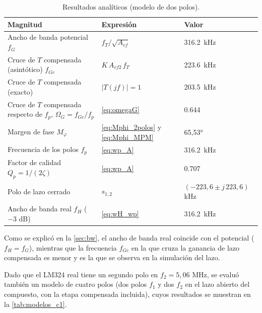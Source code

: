 \begin{table}[H]
\centering
\caption{Resultados analíticos (modelo de dos polos).}
\label{tab:analitica_c1}
\small
\setlength{\tabcolsep}{4pt}
\begin{tabular}{>{\raggedright\arraybackslash}p{} >{\centering\arraybackslash}p{} >{\centering\arraybackslash}p{}}
\toprule
\textbf{Magnitud} & \textbf{Expresión} & \textbf{Valor} \\
\midrule
Ancho de banda potencial $f_G$ & $f_T/\sqrt{A_{vf}}$ & \SI{316,2}{kHz} \\
Cruce de $T$ compensada (asintótico) $f_{Gc}$ & $K\,A_{vf2}\,f_T$ & \SI{223,6}{kHz} \\
Cruce de $T$ compensada (exacto) & $|T(jf)|=1$ & \SI{203,5}{kHz} \\
Cruce de $T$ compensada respecto de $f_p$, $\Omega_G = f_{Gc}/f_p$ & \autoref{eq:omegaG} & \num{0,644} \\
Margen de fase $M_\varphi$ & \autoref{eq:Mphi_2polos} y \autoref{eq:Mphi_MPM} & \ang{65,53} \\
Frecuencia de los polos $f_p$ & \autoref{eq:wp_A} & \SI{316,2}{kHz} \\
Factor de calidad $Q_p = 1/(2\zeta)$ & \autoref{eq:wp_A} & \num{0,707} \\
Polo de lazo cerrado & $s_{1,2}$ & $(-223{,}6 \pm j\,223{,}6)$ kHz \\
Ancho de banda real $f_H$ ($-3$ dB) & \autoref{eq:wH_wp} & \SI{316,2}{kHz} \\
\bottomrule
\end{tabular}
\end{table}

Como se explicó en la \autoref{sec:bw}, el ancho de banda real coincide con el potencial ($f_H = f_G$), mientras que la frecuencia $f_{Gc}$ en la que cruza la ganancia de lazo compensada es menor y es la que se observa en la simulación del lazo.

Dado que el LM324 real tiene un segundo polo en $f_2 = 5{,}06\text{ MHz}$, se evaluó también un modelo de cuatro polos (dos polos $f_1$ y dos $f_2$ en el lazo abierto del compuesto, con la etapa compensada incluida), cuyos resultados se muestran en la \autoref{tab:modelos_c1}.

